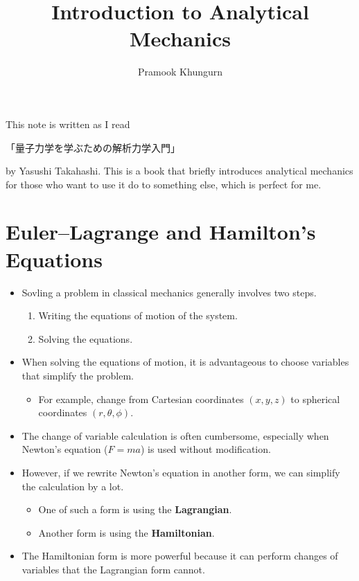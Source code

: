\documentclass[10pt]{article}
\title{Introduction to Analytical Mechanics}
\author{Pramook Khungurn}
\begin{document}
  \maketitle

  This note is written as I read \begin{CJK}{UTF8}{min}「量子力学を学ぶための解析力学入門」\end{CJK} by Yasushi Takahashi. This is a book that briefly introduces analytical mechanics for those who want to use it do to something else, which is perfect for me.

  \section{Euler--Lagrange and Hamilton's Equations} \label{sec:el-hamilton}

  \begin{itemize}
  	\item Sovling a problem in classical mechanics generally involves two steps.
  	\begin{enumerate}
  		\item Writing the equations of motion of the system.
  		\item Solving the equations.
  	\end{enumerate}

  	\item When solving the equations of motion, it is advantageous to choose variables that simplify the problem.
  	\begin{itemize}
  		\item For example, change from Cartesian coordinates $(x,y,z)$ to spherical coordinates $(r,\theta,\phi)$.
  	\end{itemize}

  	\item The change of variable calculation is often cumbersome, especially when Newton's equation ($F = ma$) is used without modification.

  	\item However, if we rewrite Newton's equation in another form, we can simplify the calculation by a lot.
  	\begin{itemize}
  		\item One of such a form is using the {\bf Lagrangian}.
  		\item Another form is using the {\bf Hamiltonian}.
  	\end{itemize}

  	\item The Hamiltonian form is more powerful because it can perform changes of variables that the Lagrangian form cannot.
  \end{itemize}
\end{document}
